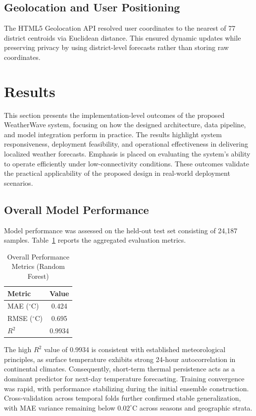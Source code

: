 \documentclass[conference]{IEEEtran}
\begin{document}
\subsection{Geolocation and User Positioning}
The HTML5 Geolocation API resolved user coordinates to the nearest of 77 district centroids via Euclidean distance. This ensured dynamic updates while preserving privacy by using district-level forecasts rather than storing raw coordinates.


\section{Results}
This section presents the implementation-level outcomes of the proposed WeatherWave system, focusing on how the designed architecture, data pipeline, and model integration perform in practice. The results highlight system responsiveness, deployment feasibility, and operational effectiveness in delivering localized weather forecasts. Emphasis is placed on evaluating the system’s ability to operate efficiently under low-connectivity conditions. These outcomes validate the practical applicability of the proposed design in real-world deployment scenarios.

\subsection{Overall Model Performance}

Model performance was assessed on the held-out test set consisting of 24,187 samples. Table~\ref{tab:overall_metrics} reports the aggregated evaluation metrics.

\begin{table}[htbp]
\caption{Overall Performance Metrics (Random Forest)}
\label{tab:overall_metrics}
\centering
\begin{tabular}{lc}
\hline
\textbf{Metric} & \textbf{Value} \\
\hline
MAE ($^\circ$C) & 0.424 \\
RMSE ($^\circ$C) & 0.695 \\
$R^2$ & 0.9934 \\
\hline
\end{tabular}
\end{table}

The high $R^2$ value of 0.9934 is consistent with established meteorological principles, as surface temperature exhibits strong 24-hour autocorrelation in continental climates. Consequently, short-term thermal persistence acts as a dominant predictor for next-day temperature forecasting. Training convergence was rapid, with performance stabilizing during the initial ensemble construction. Cross-validation across temporal folds further confirmed stable generalization, with MAE variance remaining below $0.02^\circ$C across seasons and geographic strata.
\end{document}

